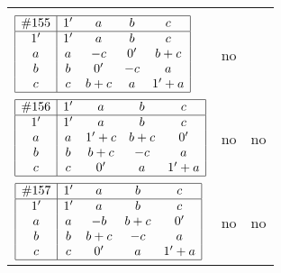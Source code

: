 \documentclass[12pt]{article}
\newcommand{\join}{\mathbin{+}}%
\newcommand{\id}{{1'}}%
\renewcommand{\div}{0'}
\begin{document}
\begin{center}
\begin{longtable}{l|c|c}
{\begin{tikzpicture}[<->,shorten <=1pt,shorten >=1pt,label distance=0mm, font=\small]
\end{tikzpicture}
}      \\[15mm]

$
\begin{array}{|c|cccc|} \hline
\#155 & \id & a & b & c \\ \hline
\id & \id & a & b & c \\
a & a & -c & \div & b \join c \\
b & b & \div & -c & a \\
c & c & b \join c & a & \id \join a \\ \hline
\end{array}
$
 & no  
 & \adjustbox{valign=c, max height=1.6cm}{$
\left[ \begin{array}{cccccc}
\id & a & a & b & c & b \\ 
a & \id & a & a & b & c \\ 
a & a & \id & b & c & b \\ 
b & a & b & \id & a & b \\ 
c & b & c & a & \id & a \\ 
b & c & b & b & a & \id
\end{array}\right]
$}      \\[15mm]

$
\begin{array}{|c|cccc|} \hline
\#156 & \id & a & b & c \\ \hline
\id & \id & a & b & c \\
a & a & \id \join c & b \join c & \div \\
b & b & b \join c & -c & a \\
c & c & \div & a & \id \join a \\ \hline
\end{array}
$
 & no  
 & no      \\[15mm]

$
\begin{array}{|c|cccc|} \hline
\#157 & \id & a & b & c \\ \hline
\id & \id & a & b & c \\
a & a & -b & b \join c & \div \\
b & b & b \join c & -c & a \\
c & c & \div & a & \id \join a \\ \hline
\end{array}
$
 & no  
 & no      \\[15mm]


\end{longtable}
\end{center}
\end{document}
